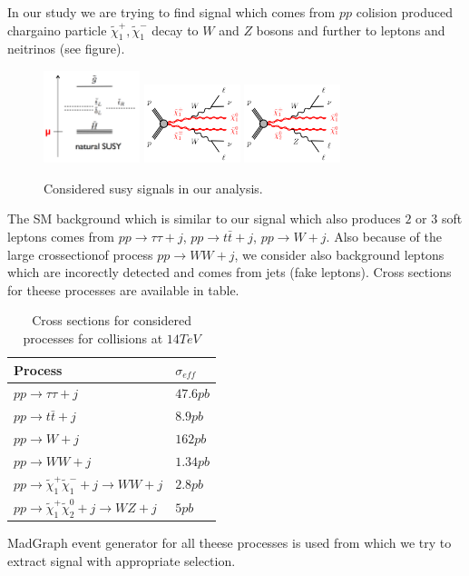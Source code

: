 \documentclass[tightenline,notitlepage,nofootinbib]{revtex4-1}
\begin{document}
  In our study we are trying to find signal which comes from $pp$ colision produced chargaino particle $\tilde \chi_1^{+},\tilde \chi_1^{-}$ decay to $W$ and $Z$ bosons and further to leptons and neitrinos (see figure).
  \begin{figure}[!ht]
    \centering
    \includegraphics[width=0.25\textwidth]{splittings.png}
    \includegraphics[width=0.25\textwidth]{C1C1.png}
    \includegraphics[width=0.25\textwidth]{C1N2.png}
    \caption{Considered susy signals in our analysis.}
  \end{figure}
The SM background which is similar to our signal which also produces $2$ or $3$ soft leptons comes from $pp\rightarrow \tau \tau + j$, $pp\rightarrow t \bar t + j$, $pp \rightarrow W + j$. Also because of the large crossectionof process $pp \rightarrow WW +j$, we consider also background leptons which are incorectly detected and comes from jets (fake leptons). Cross sections for theese processes are available in table. 
\begin{table}[!ht]
  \centering
  \begin{tabular}{ll}
    Process & $\sigma_{eff}$ \\
    \hline
    $pp\rightarrow \tau \tau + j$ & $47.6 pb$\\
    $pp\rightarrow t \bar t + j$ & $ 8.9pb$\\
    $pp \rightarrow W + j$ &  $162pb$ \\
    $pp \rightarrow WW +j$ & $1.34 pb$\\
    $pp \rightarrow \tilde \chi_1^{+}\tilde \chi_1^{-} + j \rightarrow WW + j$ & $2.8pb$\\
    $pp \rightarrow \tilde \chi_1^{+}\tilde \chi_2^{0} + j \rightarrow WZ + j$ & $5pb$\\
  \end{tabular}
  \caption{Cross sections for considered processes for collisions at $14 TeV$}
\end{table}
MadGraph event generator for all theese processes is used from which we try to extract signal with appropriate selection. 
\end{document}
